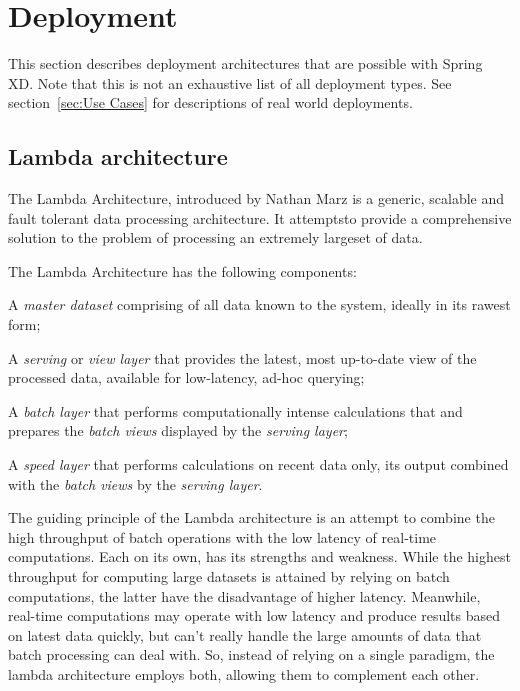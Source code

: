 \section{Deployment}
This section describes deployment architectures that are possible with Spring XD.
Note that this is not an exhaustive list of all deployment types. See
section~\ref{sec:Use Cases} for descriptions of real world deployments.

\subsection{Lambda architecture}

The Lambda Architecture, introduced by Nathan Marz \cite{lambda-architecture-paper}
is a generic, scalable and fault tolerant data  processing architecture. It 
attemptsto provide a comprehensive solution to the problem of processing an 
extremely largeset of data.

The Lambda Architecture has the following components:

\begin{itemize*}
\item A \emph{master dataset} comprising of all data known to the system,
ideally in its rawest form;
\item A \emph{serving} or \emph{view layer} that provides the latest,
most up-to-date view of the processed data, available for low-latency,
ad-hoc querying;
\item A \emph{batch layer} that performs computationally intense 
calculations that and prepares the \emph{batch views} displayed by the 
\emph{serving layer};
\item A \emph{speed layer} that performs calculations on recent data only, 
its output combined with the \emph{batch views} by the \emph{serving layer}.
\end{itemize*}

The guiding principle of the Lambda architecture is an attempt to combine the
high throughput of batch operations with the low latency of real-time
computations. Each on its own, has its strengths and weakness. While the
highest throughput for computing large datasets is attained by relying on
batch computations, the latter have the disadvantage of higher latency.
Meanwhile, real-time computations may operate with low latency and produce
results based on latest data quickly, but can't really handle the large
amounts of data that batch processing can deal with. So, instead of relying
on a single paradigm, the lambda architecture employs both, allowing them
to complement each other.

